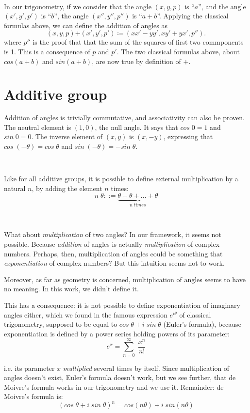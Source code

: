 \documentclass[11pt]{article}
\theoremstyle{definition}
\begin{document}
\

\noindent In our trigonometry, if we consider that the angle $(x, y,
p)$ is ``$a$'', and the angle $(x', y', p')$ is ``$b$'', the angle
$(x'', y'', p'')$ is ``$a + b$''. Applying the classical formulas
above, we can define the addition of angles as
\[
(x, y, p) \boldsymbol{+} (x', y', p') \coloneqq (x x' - y y', x y' + y
x', p'').
\]
where $p''$ is the proof that that the sum of the squares of first two
commponents is 1. This is a consequence of $p$ and $p'$. The two
classical formulas above, about $cos(a+b)$ and $sin(a+b)$, are now
true by definition of $+$.

\section{Additive group}

Addition of angles is trivially commutative, and associativity can
also be proven. The neutral element is $(1, 0)$, the null angle. It
says that $cos\;0=1$ and $sin\;0=0$. The inverse element of $(x, y)$
is $(x, -y)$, expressing that $cos\;(- \theta) = cos\;\theta$ and
$sin\;(- \theta) = - sin\;\theta$.

\

\noindent Like for all additive groups, it is possible to define
external multiplication by a natural $n$, by adding the element $n$
times:
\[
  n \; \theta ::=
  \underbrace{\theta + \theta + ... + \theta}_{n \; times}
\]

\

What about {\em multiplication} of two angles? In our framework, it
seems not possible. Because {\em addition} of angles is actually {\em
  multiplication} of complex numbers. Perhaps, then, multiplication of
angles could be something that {\em exponentiation} of complex
numbers? But this intuition seems not to work.

Moreover, as far as geometry is concerned, multiplication of angles
seems to have no meaning. In this work, we didn't define it.

This has a consequence: it is not possible to define exponentiation of
imaginary angles either, which we found in the famous expression
$e^{i\theta}$ of classical trigonometry, supposed to be equal to
$cos\;\theta+i\;sin\;\theta$ (Euler's formula), because exponentiation
is defined by a power series holding powers of its parameter:
\[
e^x = \sum_{n=0}^\infty{\; \frac{x^n}{n!}}
\]

i.e. its parameter $x$ {\em multiplied} several times by itself. Since
multiplication of angles doesn't exist, Euler's formula doesn't work,
but we see further, that de Moivre's formula works in our trigonometry
and we use it. Remainder: de Moivre's formula is:
\[
(cos \; \theta + i \; sin \; \theta)^n = cos (n \theta) + i \; sin (n
\theta)
\]
\end{document}
